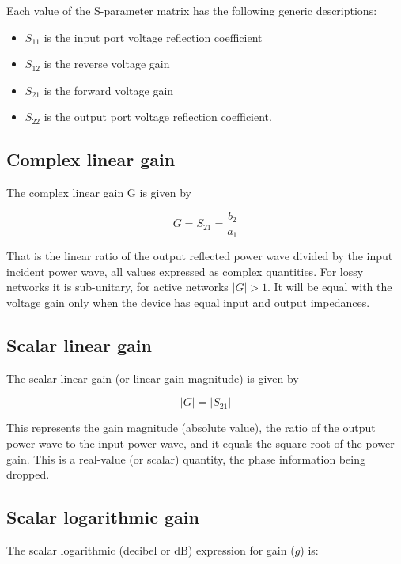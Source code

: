 \documentclass[a4paper,12pt]{report}
\begin{document}
Each value of the S-parameter matrix has the following generic descriptions:

\begin{itemize}
  \item $S_{11}$ is the input port voltage reflection coefficient
  \item $S_{12}$ is the reverse voltage gain
  \item $S_{21}$ is the forward voltage gain
  \item $S_{22}$ is the output port voltage reflection coefficient.
\end{itemize}

\subsection{Complex linear gain}

The complex linear gain G is given by

\begin{equation}
  G = S_{21} = \frac{b_2}{a_1}
\end{equation}

That is the linear ratio of the output reflected power wave
divided by the input incident power wave,
all values expressed as complex quantities.
For lossy networks it is sub-unitary,
for active networks $|G| > 1$.
It will be equal with the voltage gain only when the
device has equal input and output impedances.

\subsection{Scalar linear gain}

The scalar linear gain (or linear gain magnitude) is given by

\begin{equation}
  |G| = |S_{21}|
\end{equation}

This represents the gain magnitude (absolute value),
the ratio of the output power-wave to the input power-wave,
and it equals the square-root of the power gain.
This is a real-value (or scalar) quantity,
the phase information being dropped.

\subsection{Scalar logarithmic gain}

The scalar logarithmic (decibel or dB) expression for gain ($g$) is:
\end{document}
